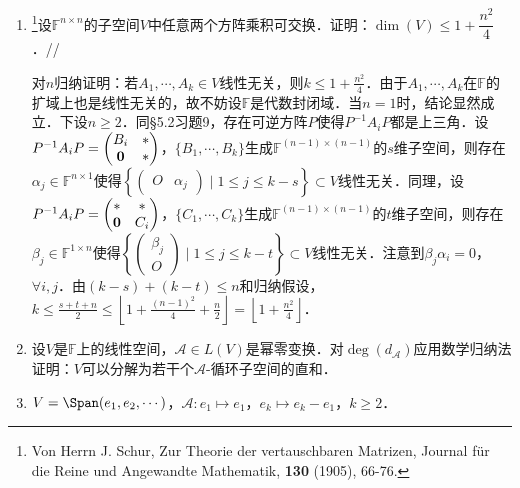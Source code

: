 \begin{enumerate}
\item \footnote{Von Herrn J. Schur, Zur Theorie der vertauschbaren Matrizen, Journal f\"ur die Reine und Angewandte Mathematik, {\bf 130} (1905), 66-76.}设$\mathbb{F}^{n\times n}$的子空间$V$中任意两个方阵乘积可交换．证明：$\dim(V)\le 1+\dfrac{n^2}{4}$．//

对$n$归纳证明：若$A_1,\cdots,A_k\in V$线性无关，则$k\le 1+\frac{n^2}{4}$．由于$A_1,\cdots,A_k$在$\mathbb{F}$的扩域上也是线性无关的，故不妨设$\mathbb{F}$是代数封闭域．当$n=1$时，结论显然成立．下设$n\ge 2$．同\S5.2习题9，存在可逆方阵$P$使得$P^{-1}A_iP$都是上三角．设$P^{-1}A_iP=\begin{pmatrix}B_i&* \\ {\bf 0}&*\end{pmatrix}$，$\{B_1,\cdots,B_k\}$生成$\mathbb{F}^{(n-1)\times(n-1)}$的$s$维子空间，则存在$\alpha_j\in\mathbb{F}^{n\times 1}$使得$\left\{\begin{pmatrix}O&\alpha_j\end{pmatrix}\mid 1\le j\le k-s\right\}\subset V$线性无关．同理，设$P^{-1}A_iP=\begin{pmatrix}*&* \\ {\bf 0}&C_i\end{pmatrix}$，$\{C_1,\cdots,C_k\}$生成$\mathbb{F}^{(n-1)\times(n-1)}$的$t$维子空间，则存在$\beta_j\in\mathbb{F}^{1\times n}$使得$\left\{\begin{pmatrix}\beta_j \\ O\end{pmatrix}\mid 1\le j\le k-t\right\}\subset V$线性无关．注意到$\beta_j\alpha_i=0$，$\forall i,j$．由$(k-s)+(k-t)\le n$和归纳假设，$k\le\frac{s+t+n}{2}\le\left\lfloor 1+\frac{(n-1)^2}{4}+\frac{n}{2}\right\rfloor=\left\lfloor 1+\frac{n^2}{4}\right\rfloor$．

\item 设$V$是$\mathbb{F}$上的线性空间，$\mathcal{A}\in L(V)$是幂零变换．对$\deg(d_{\mathcal{A}})$应用数学归纳法证明：$V$可以分解为若干个$\mathcal{A}$-循环子空间的直和．
\item $V=\Span(e_1,e_2,\cdots)$，$\mathcal{A}:e_1\mapsto e_1$，$e_k\mapsto e_k-e_1$，$k\ge 2$．
\end{enumerate}

